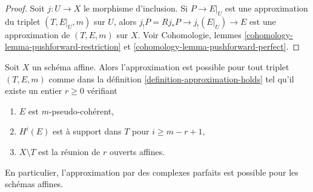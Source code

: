 \begin{proof}
Soit $j : U \to X$ le morphisme d'inclusion.
Si $P \to E|_U$ est une approximation du triplet $(T, E|_U, m)$
sur $U$, alors $j_!P = Rj_*P \to j_!(E|_U) \to E$ est une approximation
de $(T, E, m)$ sur $X$.
Voir Cohomologie, lemmes \ref{cohomology-lemma-pushforward-restriction} et
\ref{cohomology-lemma-pushforward-perfect}.
\end{proof}

\begin{lemma}
\label{lemma-approximation-affine}
Soit $X$ un schéma affine. Alors l'approximation est possible pour tout
triplet $(T, E, m)$ comme dans la définition \ref{definition-approximation-holds}
tel qu'il existe un entier $r \geq 0$ vérifiant
\begin{enumerate}
\item $E$ est $m$-pseudo-cohérent,
\item $H^i(E)$ est à support dans $T$ pour $i \geq m - r + 1$,
\item $X \setminus T$ est la réunion de $r$ ouverts affines.
\end{enumerate}
En particulier, l'approximation par des complexes parfaits est possible pour les schémas affines.
\end{lemma}

